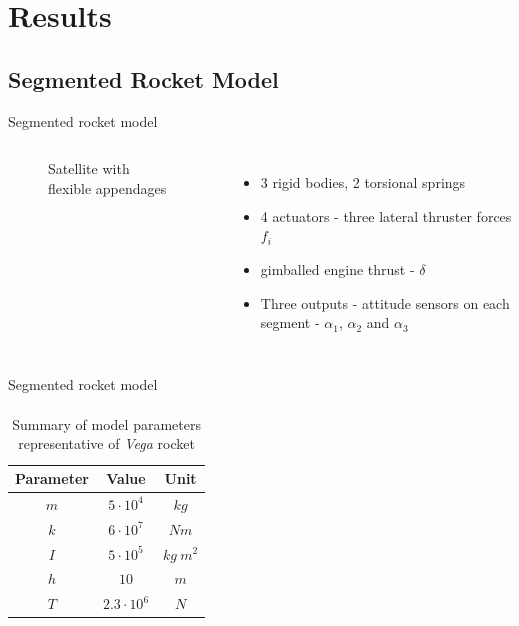 \documentclass{beamer}
\begin{document}
\section{Results}

\subsection{Segmented Rocket Model}

\begin{frame}{Segmented rocket model}
\begin{columns} %
\begin{figure}

\caption{Satellite with flexible appendages}
\end{figure}
\begin{itemize}
\item 3 rigid bodies, 2 torsional springs
\item 4 actuators - three lateral thruster forces $f_i$
\item gimballed engine thrust - $\delta$
\item Three outputs - attitude sensors on each segment - $\alpha_1$, $\alpha_2$ and $\alpha_3$
\end{itemize}
\end{columns}
\end{frame}

\begin{frame}{Segmented rocket model}
\begin{multline}

\end{multline}
\begin{equation}

\end{equation}
\end{frame}

\begin{frame}
\begin{table}[!ht]
  \begin{center}
    \caption{Summary of model parameters representative of \emph{Vega} rocket \label{tab:modelparam}}
    \vspace{1mm}
    \begin{tabular}{ ccc }
	\hline
           Parameter & Value & Unit \\
	\hline
      	$m$ & $5 \cdot 10^4$ & $kg$\\
      	$k$ & $6 \cdot 10^7$ & $Nm$\\
      	$I$ & $5 \cdot 10^5$ & $kg~m^2$\\
      	$h$ & $10$ & $m$\\
      	$T$ & $2.3 \cdot 10^6$ & $N$\\
    \end{tabular}
  \end{center}
\end{table}
\end{frame}
\end{document}
